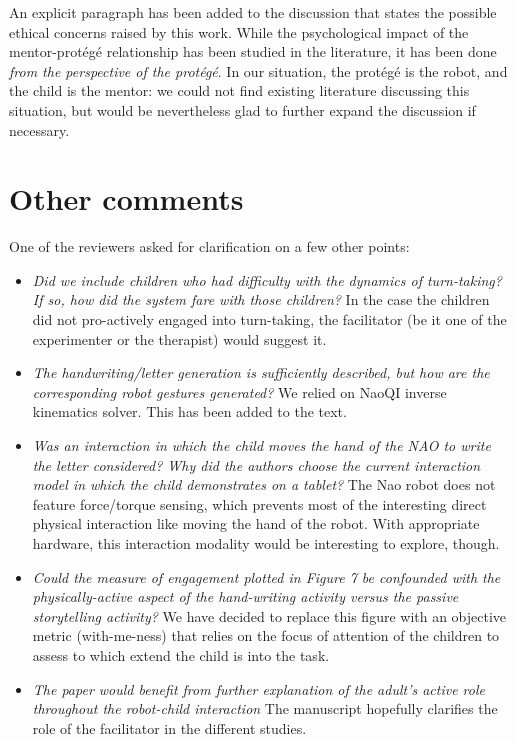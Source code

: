 \documentclass{article}
\begin{document}
An explicit paragraph has been added to the discussion that states the possible
ethical concerns raised by this work. While the psychological impact of the
mentor-protégé relationship has been studied in the literature, it has been
done \emph{from the perspective of the protégé}. In our situation, the protégé
is the robot, and the child is the mentor: we could not find existing
literature discussing this situation, but would be nevertheless glad to further
expand the discussion if necessary.

\section*{Other comments}

One of the reviewers asked for clarification on a few other points:

\begin{itemize}

\item \emph{Did we include children who had difficulty with the dynamics of
turn-taking? If so, how did the system fare with those children?} In the case
the children did not pro-actively engaged into turn-taking, the facilitator (be
it one of the experimenter or the therapist) would suggest it.

\item \emph{The handwriting/letter generation is sufficiently described, but
how are the corresponding robot gestures generated?} We relied on NaoQI inverse
kinematics solver. This has been added to the text.

\item \emph{Was an interaction in which the child moves the hand of the NAO to
write the letter considered? Why did the authors choose the current interaction
model in which the child demonstrates on a tablet?} The Nao robot does not
feature force/torque sensing, which prevents most of the interesting direct
physical interaction like moving the hand of the robot. With appropriate
hardware, this interaction modality would be interesting to explore, though.

\item \emph{Could the measure of engagement plotted in Figure 7 be confounded
with the physically-active aspect of the hand-writing activity versus the
passive storytelling activity?} We have decided to replace this figure with an
objective metric (with-me-ness) that relies on the focus of attention of the
children to assess to which extend the child is into the task.

\item \emph{The paper would benefit from further explanation of the adult's
active role throughout the robot-child interaction} The manuscript hopefully
clarifies the role of the facilitator in the different studies.

\end{itemize}
\end{document}
